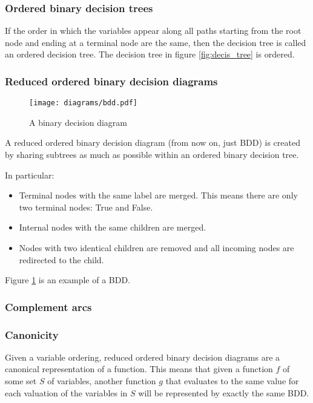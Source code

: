 \documentclass{book}
\theoremstyle{definition}
\begin{document}
\subsubsection{Ordered binary decision trees}

If the order in which the variables appear along all paths starting from the root node and ending at a terminal node are the same, then the decision tree is called an ordered decision tree. The decision tree in figure \ref{fig:decis_tree} is ordered.

\subsubsection{Reduced ordered binary decision diagrams}

\begin{figure}[t]
\centering
\texttt{[image: diagrams/bdd.pdf]}
\caption{A binary decision diagram}
\label{fig:bdd}
\end{figure}

A reduced ordered binary decision diagram (from now on, just BDD) is created by sharing subtrees as much as possible within an ordered binary decision tree.

In particular: 
\begin{itemize}
    \item Terminal nodes with the same label are merged. This means there are only two terminal nodes: True and False.
    \item Internal nodes with the same children are merged.
    \item Nodes with two identical children are removed and all incoming nodes are redirected to the child.
\end{itemize}

Figure \ref{fig:bdd} is an example of a BDD.

\subsubsection{Complement arcs}

\subsubsection{Canonicity}
Given a variable ordering, reduced ordered binary decision diagrams are a canonical representation of a function. This means that given a function $f$ of some set $S$ of variables, another function $g$ that evaluates to the same value for each valuation of the variables in $S$ will be represented by exactly the same BDD.
\end{document}
